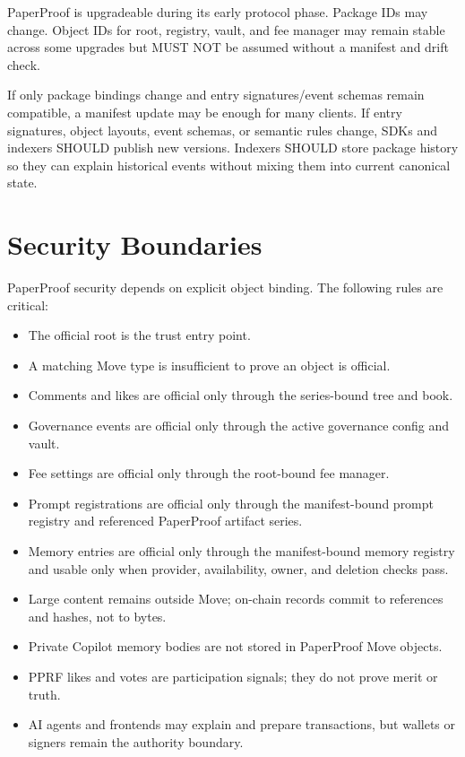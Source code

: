 \documentclass[11pt]{article}
\begin{document}
PaperProof is upgradeable during its early protocol phase. Package IDs may change. Object IDs for root, registry, vault, and fee manager may remain stable across some upgrades but MUST NOT be assumed without a manifest and drift check.

If only package bindings change and entry signatures/event schemas remain compatible, a manifest update may be enough for many clients. If entry signatures, object layouts, event schemas, or semantic rules change, SDKs and indexers SHOULD publish new versions. Indexers SHOULD store package history so they can explain historical events without mixing them into current canonical state.

\section{Security Boundaries}

PaperProof security depends on explicit object binding. The following rules are critical:

\begin{itemize}[leftmargin=*]
  \item The official root is the trust entry point.
  \item A matching Move type is insufficient to prove an object is official.
  \item Comments and likes are official only through the series-bound tree and book.
  \item Governance events are official only through the active governance config and vault.
  \item Fee settings are official only through the root-bound fee manager.
  \item Prompt registrations are official only through the manifest-bound prompt registry and referenced PaperProof artifact series.
  \item Memory entries are official only through the manifest-bound memory registry and usable only when provider, availability, owner, and deletion checks pass.
  \item Large content remains outside Move; on-chain records commit to references and hashes, not to bytes.
  \item Private Copilot memory bodies are not stored in PaperProof Move objects.
  \item PPRF likes and votes are participation signals; they do not prove merit or truth.
  \item AI agents and frontends may explain and prepare transactions, but wallets or signers remain the authority boundary.
\end{itemize}
\end{document}
